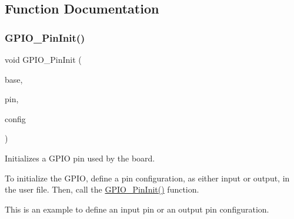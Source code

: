 \subsection{Function Documentation}
\mbox{\label{group__gpio__driver_ga0793a4e8cb6e746485012da3e487db53}} 
\subsubsection{\texorpdfstring{GPIO\_PinInit()}{GPIO\_PinInit()}}
{\footnotesize\ttfamily void G\+P\+I\+O\+\_\+\+Pin\+Init (\begin{DoxyParamCaption}\item[{\mbox{\hyperlink{struct_g_p_i_o___type}{G\+P\+I\+O\+\_\+\+Type}} $\ast$}]{base,  }\item[{uint32\+\_\+t}]{pin,  }\item[{const \mbox{\hyperlink{group__gpio_ga9279df0a87f2432dc3c5d596028223b7}{gpio\+\_\+pin\+\_\+config\+\_\+t}} $\ast$}]{config }\end{DoxyParamCaption})}



Initializes a G\+P\+IO pin used by the board. 

To initialize the G\+P\+IO, define a pin configuration, as either input or output, in the user file. Then, call the \mbox{\hyperlink{group__gpio__driver_ga0793a4e8cb6e746485012da3e487db53}{G\+P\+I\+O\+\_\+\+Pin\+Init()}} function.

This is an example to define an input pin or an output pin configuration. 
\begin{DoxyCode}{0}
\DoxyCodeLine{\{}
\DoxyCodeLine{\}}
\DoxyCodeLine{\{}
\DoxyCodeLine{\}}
\end{DoxyCode}



